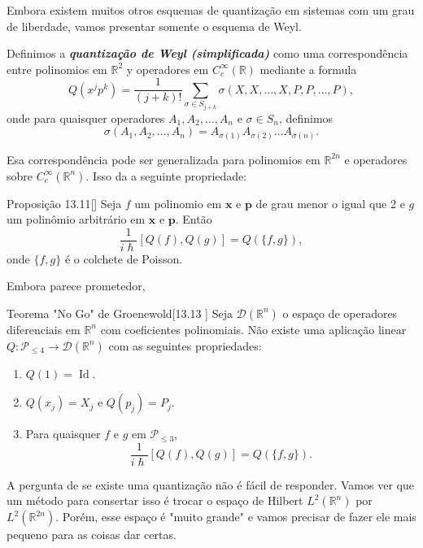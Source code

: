 Embora existem muitos otros esquemas de quantização em sistemas com um grau de liberdade, vamos presentar somente o esquema de Weyl.

\begin{defn}\leavevmode
Definimos a \textit{\textbf{quantização de Weyl (simplificada)}} como uma correspondência entre polinomios em $\mathbb{R}^{2}$ y operadores em $C^\infty_c(\mathbb{R})$ mediante a formula
\[Q(x^jp^k)=\frac{1}{(j+k)!}\sum_{\sigma\in S_{j+k}}\sigma(X,X,\ldots,X,P,P,\ldots,P),\]
onde para quaisquer operadores $A_1,A_2,\ldots,A_n$ e $\sigma \in S_n$, definimos
\[\sigma(A_1,A_2,\ldots,A_n)=A_{\sigma(1)}A_{\sigma(2)}\ldots A_{\sigma(n)}.\]
\end{defn}

Esa correspondência pode ser generalizada para polinomios em $\mathbb{R}^{2n}$ e operadores sobre $C^\infty_c(\mathbb{R}^n)$. Isso da a seguinte propriedade:

\begin{thing4}{Proposição 13.11}[\cite{hallq}]\leavevmode
Seja $f$ um polinomio em $\mathbf{x}$ e $\mathbf{p}$ de grau menor o igual que 2 e $g$ um polinômio arbitrário em $\mathbf{x}$ e $\mathbf{p}$. Então
\[\frac{1}{i \hslash}[Q(f),Q(g)]=Q(\{f,g\}),\]
onde $\{f,g\}$ é o colchete de Poisson.
\end{thing4}

Embora parece prometedor,

\begin{thing5}{Teorema "No Go" de Groenewold}[13.13 \cite{hallq}]\leavevmode
Seja $\mathcal{D}(\mathbb{R}^{n})$ o espaço de operadores diferenciais em $\mathbb{R}^n$ com coeficientes polinomiais. Não existe uma aplicação linear $Q:\mathcal{P}_{\leq 4}\to \mathcal{D}(\mathbb{R}^n)$ com as seguintes propriedades:
\begin{enumerate}
\item $Q(1)=\operatorname{Id}$.
\item $Q(x_j)=X_j$ e $Q(p_j)=P_j$.
\item Para quaisquer $f$ e $g$ em $\mathcal{P}_{\leq 3}$, 
	\[\frac{1}{i\hslash}[Q(f),Q(g)]=Q(\{f,g\}).\]
\end{enumerate}
\end{thing5}

A pergunta de se existe uma quantização não é fácil de responder. Vamos ver que um método para consertar isso é trocar o espaço de Hilbert $L^2(\mathbb{R}^n)$ por $L^2(\mathbb{R}^{2n})$. Porém, esse espaço é "muito grande" e vamos precisar de fazer ele mais pequeno para as coisas dar certas.


